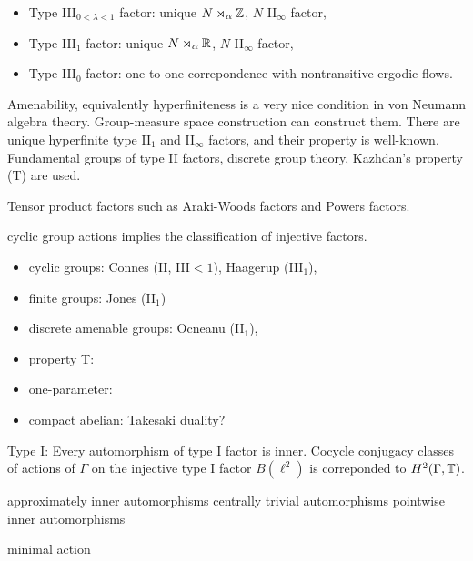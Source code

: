 \documentclass{../../large}
\begin{document}
\begin{itemize}
\item Type III$_{0<\lambda<1}$ factor: unique $N\rtimes_\alpha\mathbb{Z}$, $N$ II$_\infty$ factor,
\item Type III$_1$ factor: unique $N\rtimes_\alpha\mathbb{R}$, $N$ II$_\infty$ factor,
\item Type III$_0$ factor: one-to-one correpondence with nontransitive ergodic flows.
\end{itemize}

Amenability, equivalently hyperfiniteness is a very nice condition in von Neumann algebra theory.
Group-measure space construction can construct them.
There are unique hyperfinite type II$_1$ and II$_\infty$ factors, and their property is well-known.
Fundamental groups of type II factors, discrete group theory, Kazhdan's property (T) are used.

Tensor product factors such as Araki-Woods factors and Powers factors.








cyclic group actions implies the classification of injective factors.

\begin{itemize}
\item cyclic groups: Connes (II, III$<1$), Haagerup (III$_1$),
\item finite groups: Jones (II$_1$)
\item discrete amenable groups: Ocneanu (II$_1$), 
\item property T:
\item one-parameter:
\item compact abelian: Takesaki duality?
\end{itemize}

Type I:
Every automorphism of type I factor is inner.
Cocycle conjugacy classes of actions of $\Gamma$ on the injective type I factor $B(\ell^2)$ is correponded to $H^2(\Gamma,\mathbb{T})$.

approximately inner automorphisms
centrally trivial automorphisms
pointwise inner automorphisms

minimal action
\end{document}
